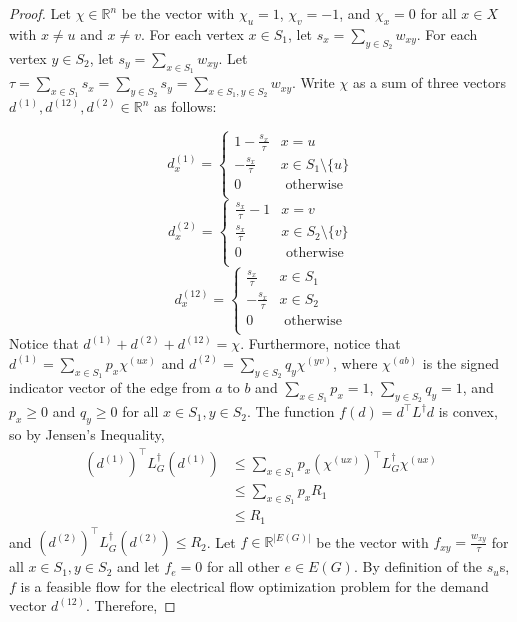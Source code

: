 \begin{proof}
Let $\chi\in \mathbb{R}^n$ be the vector with $\chi_u = 1$, $\chi_v = -1$, and $\chi_x = 0$ for all $x\in X$ with $x\ne u$ and $x\ne v$. For each vertex $x\in S_1$, let $s_x = \sum_{y\in S_2} w_{xy}$. For each vertex $y\in S_2$, let $s_y = \sum_{x\in S_1} w_{xy}$. Let $\tau = \sum_{x\in S_1} s_x = \sum_{y\in S_2} s_y = \sum_{x\in S_1,y\in S_2} w_{xy}$. Write $\chi$ as a sum of three vectors $d^{(1)},d^{(12)},d^{(2)}\in \mathbb{R}^n$ as follows:

$$d_x^{(1)} = \begin{cases} 
      1 - \frac{s_x}{\tau} & x = u \\
      -\frac{s_x}{\tau} & x\in S_1\setminus \{u\} \\
      0 & \text{ otherwise} \\
   \end{cases}$$
$$d_x^{(2)} = \begin{cases} 
      \frac{s_x}{\tau} - 1 & x = v \\
      \frac{s_x}{\tau} & x\in S_2\setminus \{v\} \\
      0 & \text{ otherwise} \\
   \end{cases}$$
$$d_x^{(12)} = \begin{cases}
      \frac{s_x}{\tau} & x\in S_1\\
      -\frac{s_x}{\tau} & x\in S_2\\
      0 & \text{ otherwise}\\
    \end{cases}$$
Notice that $d^{(1)} + d^{(2)} + d^{(12)} = \chi$. Furthermore, notice that $d^{(1)} = \sum_{x\in S_1} p_x\chi^{(ux)}$ and $d^{(2)} = \sum_{y\in S_2} q_y\chi^{(yv)}$, where $\chi^{(ab)}$ is the signed indicator vector of the edge from $a$ to $b$ and $\sum_{x\in S_1} p_x = 1$, $\sum_{y\in S_2} q_y = 1$, and $p_x\ge 0$ and $q_y\ge 0$ for all $x\in S_1,y\in S_2$. The function $f(d) = d^{\top} L^{\dag} d$ is convex, so by Jensen's Inequality,
\begin{align*}
(d^{(1)})^{\top} L_G^{\dag} (d^{(1)}) &\le \sum_{x\in S_1} p_x (\chi^{(ux)})^{\top} L_G^{\dag} \chi^{(ux)}\\
&\le \sum_{x\in S_1} p_x R_1\\
&\le R_1
\end{align*}
and $(d^{(2)})^{\top} L_G^{\dag} (d^{(2)}) \le R_2$. Let $f\in \mathbb{R}^{|E(G)|}$ be the vector with $f_{xy} = \frac{w_{xy}}{\tau}$ for all $x\in S_1,y\in S_2$ and let $f_e = 0$ for all other $e\in E(G)$. By definition of the $s_u$s, $f$ is a feasible flow for the electrical flow optimization problem for the demand vector $d^{(12)}$. Therefore,

\end{proof}
